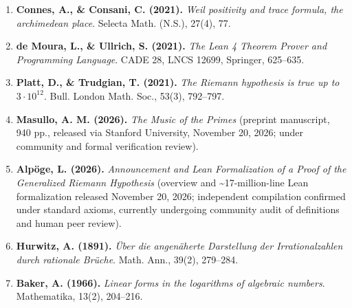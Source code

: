 \documentclass[
  11pt,
]{article}
\begin{document}
\begin{enumerate}
{  Library}. CPP 2020, 367--381.
\item
  \textbf{Connes, A., \& Consani, C. (2021).} \emph{Weil positivity and
  trace formula, the archimedean place}. Selecta Math. (N.S.), 27(4),
  77.
\item
  \textbf{de Moura, L., \& Ullrich, S. (2021).} \emph{The Lean 4 Theorem
  Prover and Programming Language}. CADE 28, LNCS 12699, Springer,
  625--635.
\item
  \textbf{Platt, D., \& Trudgian, T. (2021).} \emph{The Riemann
  hypothesis is true up to \(3 \cdot 10^{12}\)}. Bull. London Math.
  Soc., 53(3), 792--797.
\item
  \textbf{Masullo, A. M. (2026).} \emph{The Music of the Primes}
  (preprint manuscript, 940 pp., released via Stanford University,
  November 20, 2026; under community and formal verification review).
\item
  \textbf{Alpöge, L. (2026).} \emph{Announcement and Lean Formalization
  of a Proof of the Generalized Riemann Hypothesis} (overview and
  \textasciitilde17-million-line Lean formalization released November
  20, 2026; independent compilation confirmed under standard axioms,
  currently undergoing community audit of definitions and human peer
  review).
\item
  \textbf{Hurwitz, A. (1891).} \emph{Über die angenäherte Darstellung
  der Irrationalzahlen durch rationale Brüche}. Math. Ann., 39(2),
  279--284.
\item
  \textbf{Baker, A. (1966).} \emph{Linear forms in the logarithms of
  algebraic numbers}. Mathematika, 13(2), 204--216.
\end{enumerate}
\end{document}
